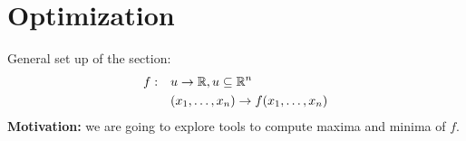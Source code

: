 \chapter{Optimization}

General set up of the section:
\begin{equation*}
    \begin{split}
        f: & \quad u\to\mathbb{R}, u\subseteq\mathbb{R}^n\\
        & \quad (x_1,\ldots,x_n)\to f(x_1,\ldots,x_n)
    \end{split}
\end{equation*}
\textbf{Motivation:} we are going to explore tools to compute maxima and minima of $f$.
